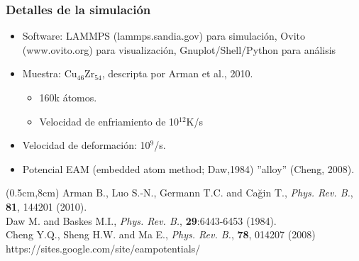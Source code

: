\begin{frame}
    \frametitle{Detalles de la simulaci\'on}
    \vspace{0.1cm}
    \begin{itemize}
        \item Software: LAMMPS (lammps.sandia.gov) para simulaci\'on, Ovito (www.ovito.org) para visualizaci\'on, Gnuplot/Shell/Python para an\'alisis
        \item Muestra: Cu$_{46}$Zr$_{54}$, descripta por Arman et al., 2010.
        \begin{itemize}
	  \item 160k \'atomos.
	  \item Velocidad de enfriamiento de 10$^{12}$K/s 
        \end{itemize}
	\item Velocidad de deformaci\'on: 10$^9$/s.
	\item Potencial EAM (embedded atom method; Daw,1984) ''alloy'' (Cheng, 2008).
    \end{itemize}
    \begin{textblock*}{12cm}(0.5cm,8cm) %
        \scriptsize{Arman B., Luo S.-N., Germann T.C. and Cağin T., \textit{Phys. Rev. B.}, \textbf{81}, 144201 (2010).\\
        Daw M. and Baskes M.I., \textit{Phys. Rev. B.}, \textbf{29}:6443-6453 (1984).\\
        Cheng Y.Q., Sheng H.W. and Ma E., \textit{Phys. Rev. B.}, \textbf{78}, 014207 (2008) https://sites.google.com/site/eampotentials/}
    \end{textblock*}
\end{frame}


